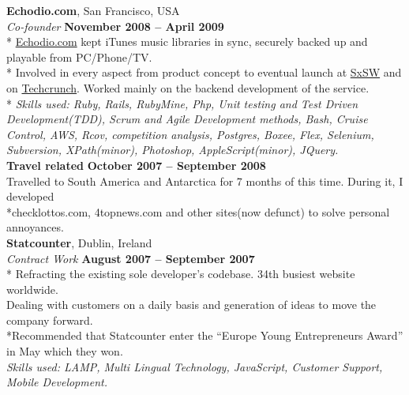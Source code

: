 \documentclass[margin,line]{resume}
\begin{document}
\begin{resume}
    \clearpage 
    \textbf{Echodio.com}, San Francisco, USA \vspace{2mm}\\\vspace{1mm}%
    \textsl{Co-founder} \hfill \textbf{November 2008 -- April 2009}\\*
    \href{http://echodio.com}{Echodio.com} kept iTunes music libraries in sync, securely backed up and playable from PC/Phone/TV. \\* 
    Involved in every aspect from product concept to eventual launch at \href{http://sxsw.com/about/history}{SxSW} and on \href{http://techcrunch.com/2009/03/17/echodio-lets-you-sync-your-itunes-to-the-cloud-300-invites/}{Techcrunch}. Worked mainly on the backend development of the service. \\*   
    \textsl{Skills used: Ruby, Rails, RubyMine, Php, Unit testing and Test Driven Development(TDD), Scrum and Agile Development methods, Bash, Cruise Control, AWS, Rcov, competition analysis, Postgres, Boxee, Flex, Selenium, Subversion, XPath(minor), Photoshop, AppleScript(minor), JQuery. } \vspace{1mm}\\%

    \textbf{Travel related} \hfill \textbf{October 2007 -- September 2008}\vspace{1mm}\\%
    Travelled to South America and Antarctica for 7 months of this time. During it, I developed \\*checklottos.com, 4topnews.com and other sites(now defunct) to solve personal annoyances. \vspace{1mm}\\%

    \textbf{Statcounter}, Dublin, Ireland \vspace{2mm}\\\vspace{1mm}%
    \textsl{Contract Work} \hfill \textbf{August 2007 -- September 2007}\\*
    Refracting the existing sole developer's codebase. 34th busiest website worldwide. \vspace{1mm}\\%
    Dealing with customers on a daily basis and generation of ideas to move the company forward. \\*Recommended that Statcounter enter the ``Europe Young Entrepreneurs Award'' in May which they won.\vspace{1mm}\\%
    \textsl{Skills used: LAMP, Multi Lingual Technology, JavaScript, Customer Support, Mobile Development.}\vspace{1mm}\\



\end{resume}
\end{document}
